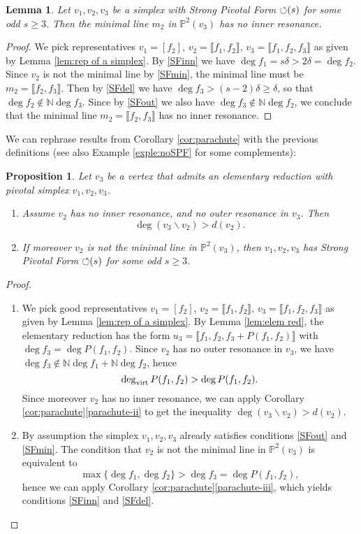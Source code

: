 \documentclass[reqno,oneside,11pt]{amsart}
\theoremstyle{plain}
\newtheorem{proposition}[theorem]{Proposition}
\newtheorem{lemma}[theorem]{Lemma}
\theoremstyle{definition}
\newcommand{\N}{\mathbb{N}}
\newcommand{\p}{\mathbb{P}}
\newcommand{\PF}{\text{$\circlearrowleft$\!\,}}
\newcommand{\dvirt}{\deg_{\text{\rm virt}}}
\newcommand{\llb}{\llbracket}
\newcommand{\rrb}{\rrbracket}
\newcommand{\lines}[1]{\p^2(#1)}
\renewcommand{\ge}{\geqslant}
\begin{document}
\begin{lemma} \label{lem:m2 in SPF}
Let $v_1, v_2, v_3$ be a simplex with Strong Pivotal Form $\PF(s)$ for some odd $s \ge 3$.
Then the minimal line $m_2$ in $\lines{v_3}$ has no inner resonance.
\end{lemma}

\begin{proof}
We pick representatives $v_1 = [f_2]$, $v_2 = \llb f_1, f_2 \rrb$, $v_3 = \llb
f_1, f_2, f_3 \rrb$ as given by Lemma \ref{lem:rep of a simplex}.
By \ref{SFinn} we have $\deg f_1 = s\delta > 2\delta = \deg f_2$.
Since $v_2$ is not the minimal line by \ref{SFmin}, the minimal line must be $m_2 = \llb f_2, f_3 \rrb$.
Then by \ref{SFdel} we have $\deg f_3 > (s-2)\delta \ge \delta$, so that $\deg f_2 \not\in \N\deg f_3$.
Since by \ref{SFout} we also have $\deg f_3 \not\in \N\deg f_2$, we conclude that the minimal line $m_2 = \llb f_2, f_3 \rrb$ has no inner resonance.
\end{proof}


We can rephrase results from Corollary \ref{cor:parachute} with the previous definitions (see also Example \ref{exple:noSPF} for some complements):

\begin{proposition} \label{pro:SPF}
Let $v_3$ be a vertex that admits an elementary reduction with pivotal simplex $v_1, v_2, v_3$.
\begin{enumerate}
\item \label{SPF1}
Assume $v_2$ has no inner resonance, and no outer resonance in $v_3$.
Then
$$\deg (v_3 \smallsetminus v_2) > d(v_2).$$
\item \label{SPF2}
If moreover $v_2$ is not the minimal line in $\lines{v_3}$, then
 $v_1, v_2, v_3$ has Strong Pivotal Form $\PF(s)$ for some odd $s \ge 3$.
\end{enumerate}
\end{proposition}

\begin{proof}
\begin{enumerate}[wide]
\item
We pick good representatives $v_1= [ f_2 ]$, $v_2 = \llb f_1, f_2 \rrb$, $v_3 =
\llb f_1, f_2, f_3 \rrb$ as given by Lemma \ref{lem:rep of a simplex}.
By Lemma \ref{lem:elem red}, the elementary reduction has the form
$u_3 = \llb f_1, f_2, f_3 + P(f_1,f_2) \rrb$
with $\deg f_3 = \deg P(f_1,f_2)$.
Since $v_2$ has no outer resonance in $v_3$, we have $\deg f_3 \not\in \N\deg f_1 + \N \deg f_2$, hence
$$\dvirt P(f_1,f_2) > \deg P(f_1,f_2).$$
Since moreover $v_2$ has no inner resonance, we can apply Corollary \ref{cor:parachute}\ref{parachute-ii} to get the inequality $\deg (v_3 \smallsetminus v_2) > d(v_2)$.
\item
By assumption the simplex $v_1, v_2, v_3$ already satisfies conditions
\ref{SFout} and \ref{SFmin}.
The condition that $v_2$ is not the minimal line in $\lines{v_3}$ is equivalent
to
$$\max\{\deg f_1, \deg f_2\} > \deg f_3 = \deg P(f_1,f_2),$$
hence we can apply Corollary \ref{cor:parachute}\ref{parachute-iii},
which yields conditions \ref{SFinn} and \ref{SFdel}.\qedhere
\end{enumerate}
\end{proof}
\end{document}
